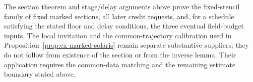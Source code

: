 The section theorem and stage/delay arguments above prove the fixed-stencil
family of fixed marked sections, all later credit requests, and, for a schedule satisfying the
stated floor and delay conditions, the three eventual field-budget
inputs. The local invitation and the common-trajectory calibration
used in Proposition~\ref{prop:ex-marked-solaris} remain separate
substantive suppliers; they do not follow from existence of the section or
from the inverse lemma. Their application requires the common-data matching and the remaining
estimate boundary stated above.
